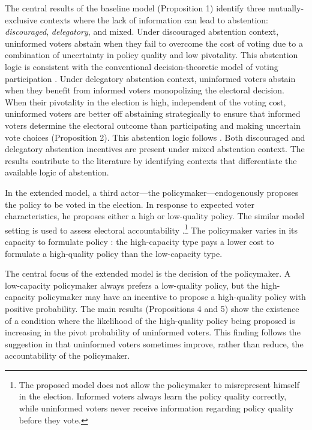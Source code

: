\documentclass[letterpaper, 12pt]{article}
\begin{document}
    \par The central results of the baseline model (Proposition 1) identify three mutually-exclusive contexts where the lack of information can lead to abstention: \textit{discouraged}, \textit{delegatory}, and mixed. Under discouraged abstention context, uninformed voters abstain when they fail to overcome the cost of voting due to a combination of uncertainty in policy quality and low pivotality. This abstention logic is consistent with the conventional decision-theoretic model of voting participation \citep{Downs1957anec, Riker1968thof, Matsusaka1995exvo}. Under delegatory abstention context, uninformed voters abstain when they benefit from informed voters monopolizing the electoral decision. When their pivotality in the election is high, independent of the voting cost, uninformed voters are better off abstaining strategically to ensure that informed voters determine the electoral outcome than participating and making uncertain vote choices (Proposition 2). This abstention logic follows \cite{Feddersen1996thsw, Feddersen1999abin}. Both discouraged and delegatory abstention incentives are present under mixed abstention context. The results contribute to the literature by identifying contexts that differentiate the available logic of abstention.
    
    \par In the extended model, a third actor---the policymaker---endogenously proposes the policy to be voted in the election. In response to expected voter characteristics, he proposes either a high or low-quality policy. The similar model setting is used to assess electoral accountability \citep{Ashworth2014isvo, Prato2016thvo}.\footnote{The proposed model does not allow the policymaker to misrepresent himself in the election. Informed voters always learn the policy quality correctly, while uninformed voters never receive information regarding policy quality before they vote.} The policymaker varies in its capacity to formulate policy \citep{Gailmard2007slan, Huber2004buca}: the high-capacity type pays a lower cost to formulate a high-quality policy than the low-capacity type. 

    \par The central focus of the extended model is the decision of the policymaker. A low-capacity policymaker always prefers a low-quality policy, but the high-capacity policymaker may have an incentive to propose a high-quality policy with positive probability. The main results (Propositions 4 and 5) show the existence of a condition where the likelihood of the high-quality policy being proposed is increasing in the pivot probability of uninformed voters. This finding follows the suggestion in \cite{Ashworth2014isvo} that uninformed voters sometimes improve, rather than reduce, the accountability of the policymaker. 
    
\end{document}
